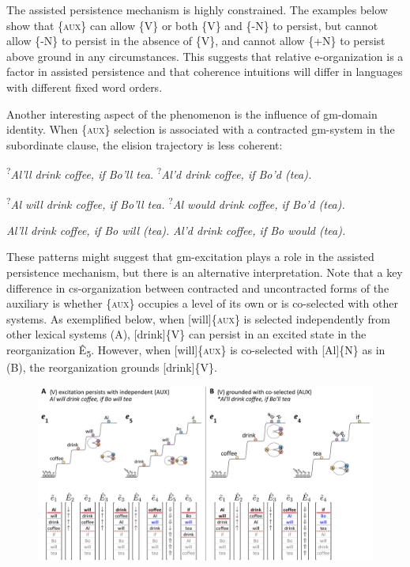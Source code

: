   The assisted persistence mechanism is highly constrained. The examples below show that \{\textsc{aux}\} can allow \{V\} or both \{V\} and \{-N\} to persist, but cannot allow \{-N\} to persist in the absence of \{V\}, and cannot allow \{+N\} to persist above ground in any circumstances. This suggests that relative e-organization is a factor in assisted persistence and that coherence intuitions will differ in languages with different fixed word orders. 

  Another interesting aspect of the phenomenon is the influence of gm-domain identity. When \{\textsc{aux}\} selection is associated with a contracted gm-system in the subordinate clause, the elision trajectory is less coherent: 

  \textsuperscript{?}\textit{Al’ll drink coffee, if Bo’ll tea.}      \textsuperscript{?}\textit{Al’d drink coffee, if Bo’d (tea).}

  \textsuperscript{?}\textit{Al will drink coffee, if Bo’ll tea.}    \textsuperscript{?}\textit{Al would drink coffee, if Bo’d (tea).}

  \textit{Al’ll drink coffee, if Bo will (tea).}    \textit{Al’d drink coffee, if Bo would (tea).}

  These patterns might suggest that gm-excitation plays a role in the assisted persistence mechanism, but there is an alternative interpretation. Note that a key difference in cs-organization between contracted and uncontracted forms of the auxiliary is whether \{\textsc{aux}\} occupies a level of its own or is co-selected with other systems. As exemplified below, when [will]\{\textsc{aux}\} is selected independently from other lexical systems (A), [drink]\{V\} can persist in an excited state in the reorganization Ê\textsubscript{5}. However, when [will]\{\textsc{aux}\} is co-selected with [Al]\{N\} as in (B), the reorganization grounds [drink]\{V\}.

  
\begin{figure}
\includegraphics[width=\textwidth]{figures/Tilsen-img148.png}
\caption{\missingcaption}
\label{fig:}
\end{figure}
 

